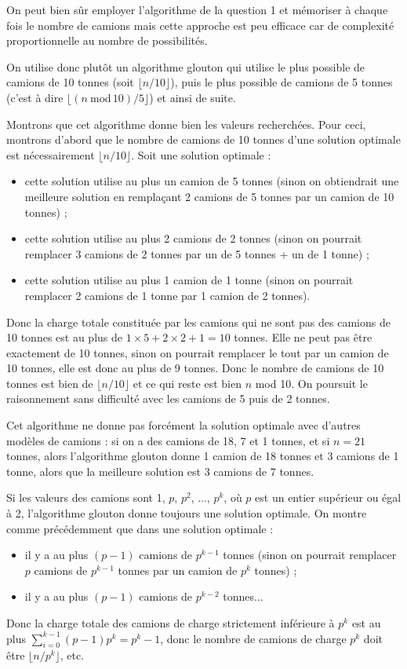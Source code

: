 \Q
On peut bien sûr employer l'algorithme de la question 1 et mémoriser à chaque fois le nombre de camions mais cette approche est peu efficace car de complexité proportionnelle au nombre de possibilités.
\medskip

On utilise donc plutôt un algorithme glouton qui utilise le plus possible de camions de 10 tonnes (soit $\lfloor n/10 \rfloor$), puis le plus possible de camions de 5 tonnes (c'est à dire $\lfloor (n\ \textrm{mod}\,10)/5\rfloor$) et ainsi de suite.



Montrons que cet algorithme donne bien les valeurs recherchées. Pour ceci, montrons d'abord que le nombre de camions de 10 tonnes d'une solution optimale est nécessairement $\lfloor n/10 \rfloor$. Soit une solution optimale :
\begin{itemize}
    \item cette solution utilise au plus un camion de 5 tonnes (sinon on obtiendrait une meilleure solution en remplaçant 2 camions de 5 tonnes par un camion de 10 tonnes) ;
    \item cette solution utilise au plus 2 camions de 2 tonnes (sinon on pourrait remplacer 3 camions de 2 tonnes par un de 5 tonnes + un de 1 tonne) ;
    \item cette solution utilise au plus 1 camion de 1 tonne (sinon on pourrait remplacer 2 camions de 1 tonne par 1 camion de 2 tonnes).
\end{itemize}
Donc la charge totale constituée par les camions qui ne sont pas des camions de 10 tonnes est au plus de $1\times5 + 2\times2 + 1=10$ tonnes. Elle ne peut pas être exactement de 10 tonnes, sinon on pourrait remplacer le tout par un camion de 10 tonnes, elle est donc au plus de 9 tonnes. Donc le nombre de camions de 10 tonnes est bien de $\lfloor n/10 \rfloor$ et ce qui reste est bien $n$ mod 10. On poursuit le raisonnement sans difficulté avec les camions de 5 puis de 2 tonnes.
\medskip

Cet algorithme ne donne pas forcément la solution optimale avec d'autres modèles de camions : si on a des camions de 18, 7 et 1 tonnes, et si $n=21$ tonnes, alors l'algorithme glouton donne 1 camion de 18 tonnes et 3 camions de 1 tonne, alors que la meilleure solution est 3 camions de 7 tonnes.
\medskip

Si les valeurs des camions sont 1, $p$, $p^2$, ..., $p^k$, où $p$ est un entier supérieur ou égal à 2, l'algorithme glouton donne toujours une solution optimale. On montre comme précédemment que dans une solution optimale :
\begin{itemize}
    \item il y a au plus $(p-1)$ camions de $p^{k-1}$ tonnes (sinon on pourrait remplacer $p$ camions de $p^{k-1}$ tonnes par un camion de $p^k$ tonnes) ;
    \item il y a au plus $(p-1)$ camions de $p^{k-2}$ tonnes...
\end{itemize}
\newpage

Donc la charge totale des camions de charge strictement inférieure à $p^k$ est au plus $\sum_{i=0}^{k-1}(p-1)p^k=p^k-1$, donc le nombre de camions de charge $p^k$ doit être $\lfloor n/p^k \rfloor$, etc.
\bigskip

\Fin
